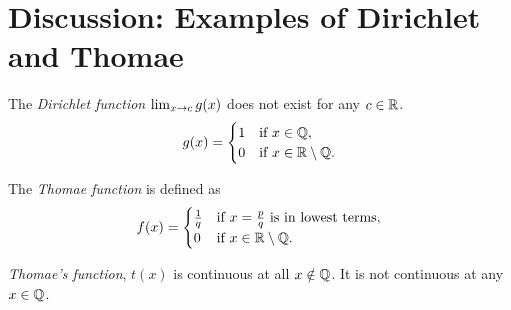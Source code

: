 \section{Discussion: Examples of Dirichlet and Thomae}

\begin{definition}
    The \textit{Dirichlet function} \(\lim_{x \rightarrow c}g(x)\) does not exist for any \(c \in \mathbb{R}\).
    \[
        g(x) = \begin{cases}
            1 & \text{if } x \in \mathbb{Q},              \\
            0 & \text{if } x \in \mathbb{R} \setminus \mathbb{Q}.
        \end{cases}
    \]
\end{definition}
\begin{center}

\end{center}

\begin{definition}
    The \textit{Thomae function} is defined as
    \[
        f(x) = \begin{cases}
            \frac{1}{q} & \text{if } x = \frac{p}{q} \text{ is in lowest terms}, \\
            0           & \text{if } x \in \mathbb{R} \setminus \mathbb{Q}.
        \end{cases}
    \]
\end{definition}

\textit{Thomae's function}, \(t(x)\) is continuous at all \(x \notin \mathbb{Q}\). It is not continuous at any \(x \in \mathbb{Q}\).

\newpage

